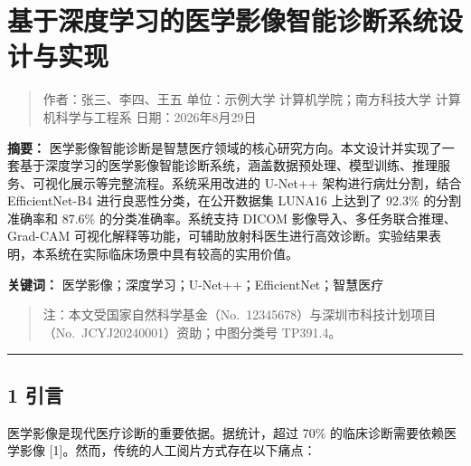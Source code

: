 \documentclass{harryopo-mathnotes}
\begin{document}
\maketitle
\thispagestyle{empty}
\cleardoublepage


\strictpagecheck
\setcounter{page}{1}
\restoregeometry
\onehalfspacing

\section{基于深度学习的医学影像智能诊断系统设计与实现}\label{ux57faux4e8eux6df1ux5ea6ux5b66ux4e60ux7684ux533bux5b66ux5f71ux50cfux667aux80fdux8bcaux65adux7cfbux7edfux8bbeux8ba1ux4e0eux5b9eux73b0}

\begin{quote}
作者：张三、李四、王五 单位：示例大学 计算机学院；南方科技大学
计算机科学与工程系 日期：2026年8月29日
\end{quote}

\textbf{摘要：}
医学影像智能诊断是智慧医疗领域的核心研究方向。本文设计并实现了一套基于深度学习的医学影像智能诊断系统，涵盖数据预处理、模型训练、推理服务、可视化展示等完整流程。系统采用改进的
U-Net++ 架构进行病灶分割，结合 EfficientNet-B4
进行良恶性分类，在公开数据集 LUNA16 上达到了 92.3\% 的分割准确率和
87.6\% 的分类准确率。系统支持 DICOM 影像导入、多任务联合推理、Grad-CAM
可视化解释等功能，可辅助放射科医生进行高效诊断。实验结果表明，本系统在实际临床场景中具有较高的实用价值。

\textbf{关键词：} 医学影像；深度学习；U-Net++；EfficientNet；智慧医疗

\begin{quote}
注：本文受国家自然科学基金（No.~12345678）与深圳市科技计划项目（No.~JCYJ20240001）资助；中图分类号
TP391.4。
\end{quote}

\begin{center}\rule{0.5\linewidth}{0.5pt}\end{center}

\subsection{1 引言}\label{ux5f15ux8a00}

医学影像是现代医疗诊断的重要依据。据统计，超过 70\%
的临床诊断需要依赖医学影像
{[}1{]}。然而，传统的人工阅片方式存在以下痛点：
\end{document}
